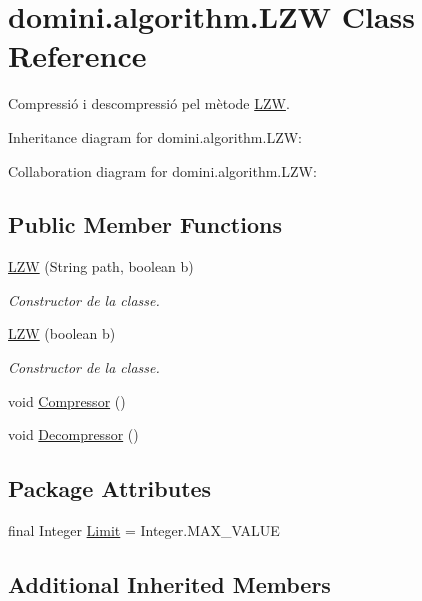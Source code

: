\hypertarget{classdomini_1_1algorithm_1_1LZW}{}\section{domini.\+algorithm.\+L\+ZW Class Reference}
\label{classdomini_1_1algorithm_1_1LZW}


Compressió i descompressió pel mètode \hyperlink{classdomini_1_1algorithm_1_1LZW}{L\+ZW}.  




Inheritance diagram for domini.\+algorithm.\+L\+ZW\+:


Collaboration diagram for domini.\+algorithm.\+L\+ZW\+:
\subsection*{Public Member Functions}
\begin{DoxyCompactItemize}
\item 
\hyperlink{classdomini_1_1algorithm_1_1LZW_ab596afb13b224da41ee590a08df642a9}{L\+ZW} (String path, boolean b)
\begin{DoxyCompactList}\small\item\em Constructor de la classe. \end{DoxyCompactList}\item 
\hyperlink{classdomini_1_1algorithm_1_1LZW_ad8feac199454cb47321930e6d737360e}{L\+ZW} (boolean b)
\begin{DoxyCompactList}\small\item\em Constructor de la classe. \end{DoxyCompactList}\item 
void \hyperlink{classdomini_1_1algorithm_1_1LZW_a04a13292c78f6d958270fec8bc6975be}{Compressor} ()
\item 
void \hyperlink{classdomini_1_1algorithm_1_1LZW_a6a5d986396443691861ac9ba41b2dd33}{Decompressor} ()
\end{DoxyCompactItemize}
\subsection*{Package Attributes}
\begin{DoxyCompactItemize}
\item 
final Integer \hyperlink{classdomini_1_1algorithm_1_1LZW_a6d83dbcda4939db767fa0522d40fcc0a}{Limit} = Integer.\+M\+A\+X\+\_\+\+V\+A\+L\+UE
\end{DoxyCompactItemize}
\subsection*{Additional Inherited Members}


